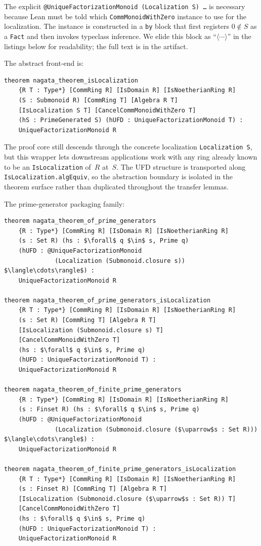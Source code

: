 \documentclass[11pt]{article}
\theoremstyle{plain}
\theoremstyle{definition}
\theoremstyle{remark}
\newcommand{\li}[1]{\texorpdfstring{\texttt{#1}}{#1}}
\begin{document}
\noindent
The explicit \li{@UniqueFactorizationMonoid (Localization S) \ldots} is
necessary because Lean must be told which \li{CommMonoidWithZero} instance to
use for the localization.  The instance is constructed in a \li{by} block that
first registers $0\notin S$ as a \li{Fact} and then invokes typeclass
inference.  We elide this block as ``$\langle\cdots\rangle$'' in the listings
below for readability; the full text is in the artifact.

The abstract front-end is:

\begin{lstlisting}[style=lean]
theorem nagata_theorem_isLocalization
    {R T : Type*} [CommRing R] [IsDomain R] [IsNoetherianRing R]
    (S : Submonoid R) [CommRing T] [Algebra R T]
    [IsLocalization S T] [CancelCommMonoidWithZero T]
    (hS : PrimeGenerated S) (hUFD : UniqueFactorizationMonoid T) :
    UniqueFactorizationMonoid R
\end{lstlisting}

\noindent
The proof core still descends through the concrete localization
\li{Localization\,S}, but this wrapper lets downstream applications work with
any ring already known to be an \li{IsLocalization} of~$R$ at~$S$.  The UFD
structure is transported along \li{IsLocalization.algEquiv}, so the abstraction
boundary is isolated in the theorem surface rather than duplicated throughout
the transfer lemmas.

The prime-generator packaging family:

\begin{lstlisting}[style=lean]
theorem nagata_theorem_of_prime_generators
    {R : Type*} [CommRing R] [IsDomain R] [IsNoetherianRing R]
    (s : Set R) (hs : $\forall$ q $\in$ s, Prime q)
    (hUFD : @UniqueFactorizationMonoid
              (Localization (Submonoid.closure s)) $\langle\cdots\rangle$) :
    UniqueFactorizationMonoid R

theorem nagata_theorem_of_prime_generators_isLocalization
    {R T : Type*} [CommRing R] [IsDomain R] [IsNoetherianRing R]
    (s : Set R) [CommRing T] [Algebra R T]
    [IsLocalization (Submonoid.closure s) T]
    [CancelCommMonoidWithZero T]
    (hs : $\forall$ q $\in$ s, Prime q)
    (hUFD : UniqueFactorizationMonoid T) :
    UniqueFactorizationMonoid R

theorem nagata_theorem_of_finite_prime_generators
    {R : Type*} [CommRing R] [IsDomain R] [IsNoetherianRing R]
    (s : Finset R) (hs : $\forall$ q $\in$ s, Prime q)
    (hUFD : @UniqueFactorizationMonoid
              (Localization (Submonoid.closure ($\uparrow$s : Set R))) $\langle\cdots\rangle$) :
    UniqueFactorizationMonoid R

theorem nagata_theorem_of_finite_prime_generators_isLocalization
    {R T : Type*} [CommRing R] [IsDomain R] [IsNoetherianRing R]
    (s : Finset R) [CommRing T] [Algebra R T]
    [IsLocalization (Submonoid.closure ($\uparrow$s : Set R)) T]
    [CancelCommMonoidWithZero T]
    (hs : $\forall$ q $\in$ s, Prime q)
    (hUFD : UniqueFactorizationMonoid T) :
    UniqueFactorizationMonoid R
\end{lstlisting}
\end{document}
